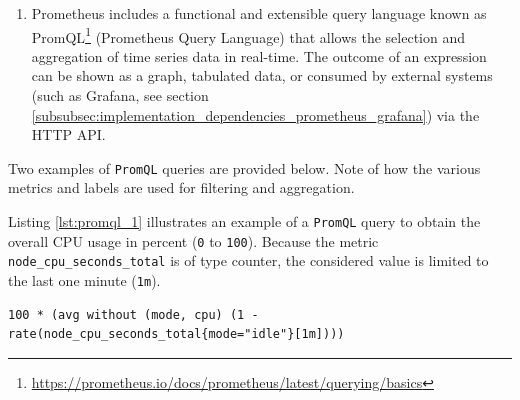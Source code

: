 \begin{enumerate}
\begin{enumerate}
\begin{enumerate}
          \item \texttt{Summary}
            \newline
            Similar to \texttt{Histogram} type, it also calculates configurable
            quantiles over a time window\footnote{\url{https://prometheus.io/docs/concepts/metric_types/\#summary}}.
        \end{enumerate}

      \item \texttt{Labels}
        \newline
        Labels allow Prometheus' dimensional data model: each given combination
        of labels for the same metric name identifies a unique dimensional
        instantiation of that metric. These dimensions can be used to filter and
        aggregate data by the \texttt{PromQL} query language.
        \newline
        For example, \lstinline[language=prometheus, alsoletter={_},
        morekeywords={node_cpu_seconds_total}, morekeywords={[2]{cpu, mode}}]|node_cpu_seconds_total{cpu="0",mode="idle"}|,
        determines the number of seconds spent in idle mode by CPU core 0.
    \end{enumerate}

  \item Prometheus includes a functional and extensible query language known as PromQL\footnote{\url{https://prometheus.io/docs/prometheus/latest/querying/basics}}
    (Prometheus Query Language) that allows the selection and aggregation of time
    series data in real-time. The outcome of an expression can be shown as a
    graph, tabulated data, or consumed by external systems (such as Grafana, see
    section \ref{subsubsec:implementation_dependencies_prometheus_grafana}) via the
    HTTP API\cite{prometheus_promql}.
\end{enumerate}

Two examples of \texttt{PromQL} queries are provided below. Note of how the
various metrics and labels are used for filtering and aggregation.

Listing \ref{lst:promql_1} illustrates an example of a \texttt{PromQL} query to obtain
the overall CPU usage in percent (\texttt{0} to \texttt{100}). Because the
metric \lstinline[language=prometheus, alsoletter={_}, morekeywords={node_cpu_seconds_total}]{node_cpu_seconds_total}
is of type counter, the considered value is limited to the last one minute (\texttt{1m}).

\begin{lstlisting}[language=promql, numbers=none, alsoletter={_01}, morekeywords={[2]{node_cpu_seconds_total}}, morekeywords={[3]{cpu, mode}}, morekeywords={[4]{100, 1, 1m}}, xleftmargin=\parindent, label={lst:promql_1}, caption=\texttt{PromQL} query to obtain overall CPU usage in percent]
  100 * (avg without (mode, cpu) (1 - rate(node_cpu_seconds_total{mode="idle"}[1m])))
\end{lstlisting}

